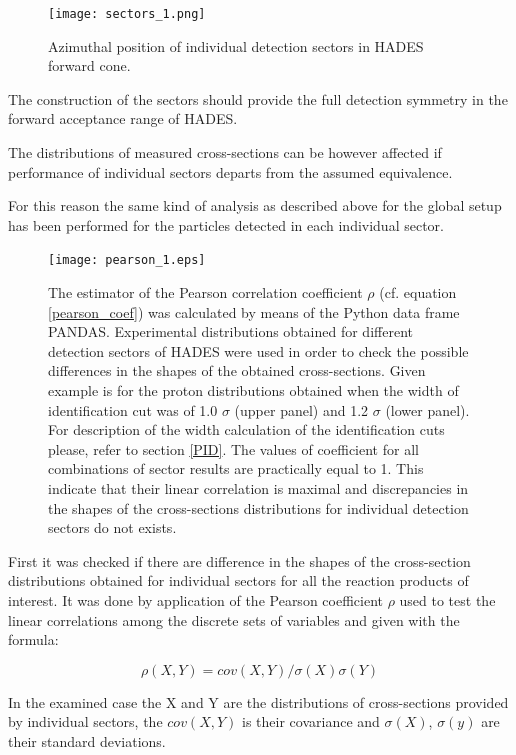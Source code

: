 \begin{figure}[!ht]
    \centering
    \texttt{[image: sectors\_1.png]}%
    \caption{Azimuthal position of individual detection sectors in HADES forward cone.}
    \label{sectors1}
\end{figure}

The construction of the sectors should provide  the full detection symmetry in the forward acceptance range of HADES.

The distributions of measured cross-sections can be however affected if performance of individual sectors  departs from the assumed equivalence.

For this reason the same kind of analysis as described above for the global setup has been performed for the particles detected in each individual sector. 

\begin{figure}[!ht]
    \centering
    \texttt{[image: pearson\_1.eps]}%
    \caption{The estimator of the Pearson correlation coefficient $\rho$ (cf. equation \ref{pearson_coef}) was calculated 
by means of the Python data frame PANDAS.
Experimental distributions obtained for different detection sectors of HADES  
were used in order to check the possible differences in the shapes of the obtained cross-sections. 
 Given example is for the proton distributions obtained when the width of identification cut was of 1.0 $\sigma$ (upper panel) and 1.2 $\sigma$ (lower panel). For description of the width calculation of the identification cuts please, refer to section \ref{PID}.
    The values of coefficient for all combinations of sector results are practically equal to 1. This indicate that their linear correlation is maximal and discrepancies in the shapes of the cross-sections distributions for individual detection sectors do not exists.}
    \label{pearson_proton}
\end{figure}
First it was checked if there are difference in the shapes of the cross-section distributions obtained for individual sectors for all the reaction products of interest. It was done by application of the Pearson coefficient $\rho$ used to test the linear correlations among the discrete sets of variables and given with the formula:

\begin{equation}
\label{pearson_coef}
\rho(X,Y) = cov(X,Y)/ \sigma(X)\sigma(Y)  
\end{equation}

In the examined case the X and Y are the 
distributions of cross-sections provided by individual sectors, the $cov(X,Y)$ is their  covariance and $\sigma(X)$, $\sigma(y)$ are their standard deviations.

